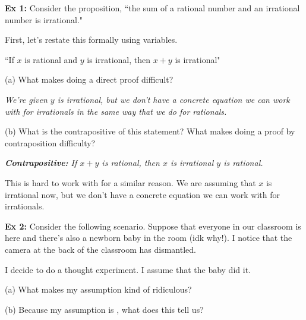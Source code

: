 \documentclass[fleqn]{article}
\theoremstyle{definition}
\begin{document}
\vspace{.25cm}
\textbf{Ex 1:} Consider the proposition, ``the sum of a rational number and an irrational number is irrational." 

\vspace{.25cm}
First, let's restate this formally using variables. 

\vspace{.25cm}
    \hspace{1cm} ``If $x$ is rational and $y$ is irrational, then $x+y$ is irrational"

\vspace{.5cm}
(a) What makes doing a direct proof difficult? 

\vspace{.5cm}
{\it We're given $y$ is irrational, but we don't have a concrete equation we can work with for irrationals in the same way that we do for rationals.} 

\vspace{.5cm}
(b) What is the contrapositive of this statement? What makes doing a proof by contraposition difficulty?

\vspace{.5cm}
{\it \textbf{Contrapositive:} If $x+y$ is rational, then $x$ is irrational \underline{\hspace{1cm}} $y$ is rational. 

\vspace{.25cm}
This is hard to work with for a similar reason. We are assuming that $x$ is irrational now, but we don't have a concrete equation we can work with for irrationals. }


\newpage
\textbf{Ex 2:} Consider the following scenario. Suppose that everyone in our classroom is here and there's also a newborn baby in the room (idk why!). I notice that the camera at the back of the classroom has dismantled. 

\vspace{.25cm}
I decide to do a thought experiment. I assume that the baby did it. 

\vspace{.25cm}
(a) What makes my assumption kind of ridiculous? 

\vspace{1.5cm}
(b) Because my assumption is \underline{\hspace{3cm}}, what does this tell us? 

\vspace{1.5cm}
\end{document}
